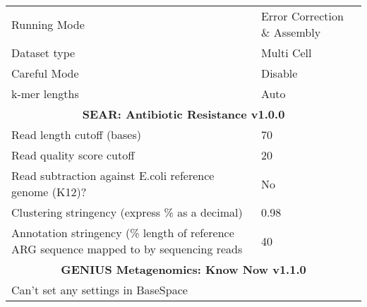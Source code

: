 \begin{table}[h!]
{\begin{tabular}{ll}
Running Mode                                    & Error Correction \& Assembly \\
Dataset type                                    & Multi Cell                   \\
Careful Mode                                    & Disable                      \\
k-mer lengths                                   & Auto                         \\
\multicolumn{2}{c}{\textbf{SEAR: Antibiotic Resistance v1.0.0}}                                           \\
Read length cutoff (bases)                      & 70                           \\
Read quality score cutoff                       & 20                           \\
Read subtraction against E.coli reference genome (K12)?                                  & No             \\
Clustering stringency (express \% as a decimal) & 0.98                         \\
Annotation stringency (\% length of reference ARG sequence mapped to by sequencing reads & 40             \\
\multicolumn{2}{c}{\textbf{GENIUS Metagenomics: Know Now v1.1.0}}                                                  \\
Can't set any settings in BaseSpace             &                             
\end{tabular}%
}
\end{table}